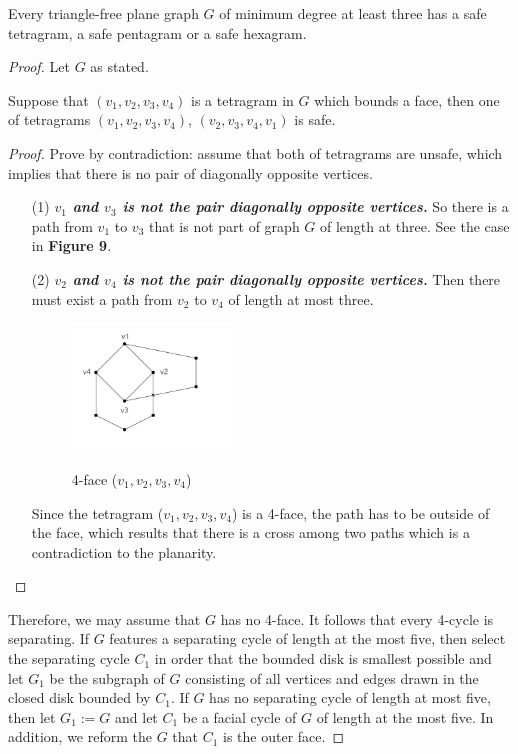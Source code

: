 \begin{lemma}
Every triangle-free plane graph $G$ of minimum degree at least three has a safe tetragram, a safe pentagram or a safe hexagram.\cite{dvorak2013threecoloring}
\end{lemma}
\begin{proof}
Let $G$ as stated. 

\begin{claim}
Suppose that $(v_1, v_2, v_3, v_4)$ is a tetragram in $G$ which bounds a face, then one of tetragrams $(v_1, v_2, v_3, v_4)$, $(v_2, v_3, v_4, v_1)$ is safe.
\end{claim}

\begin{proof}
Prove by contradiction: assume that both of tetragrams are unsafe, which implies that there is no pair of diagonally opposite vertices.
\begin{itemize}
    \item[(1)] \textit{\textbf{$v_1$ and $v_3$ is not the pair diagonally opposite vertices.}} So there is a path from $v_1$ to $v_3$ that is not part of graph $G$ of length at three. See the case in \textbf{Figure 9}.
    \item[(2)] \textit{\textbf{$v_2$ and $v_4$ is not the pair diagonally opposite vertices.}} Then there must exist a path from $v_2$ to $v_4$ of length at most three. 
    \begin{figure}[H] %
    \centering %
    \includegraphics[width=0.4\textwidth]{figure/4face.png} 
    \label{figure} %
    \caption{4-face ($v_1, v_2, v_3, v_4$)}
    \end{figure}
    Since the tetragram ($v_1, v_2, v_3, v_4$) is a 4-face, the path has to be outside of the face, which results that there is a cross among two paths which is a contradiction to the planarity.
\end{itemize}
\end{proof}
Therefore, we may assume that $G$ has no 4-face. It follows that every 4-cycle is separating. If $G$ features a separating cycle of length at the most five, then select the separating cycle $C_1$ in order that the bounded disk is smallest possible and let $G_1$ be the subgraph of $G$ consisting of all vertices and edges drawn in the closed disk bounded by $C_1$. If $G$ has no separating cycle of length at most five, then let $G_1 := G$ and let $C_1$ be a facial cycle of $G$ of length at the most five. In addition, we reform the $G$ that $C_1$ is the outer face.


\end{proof}

